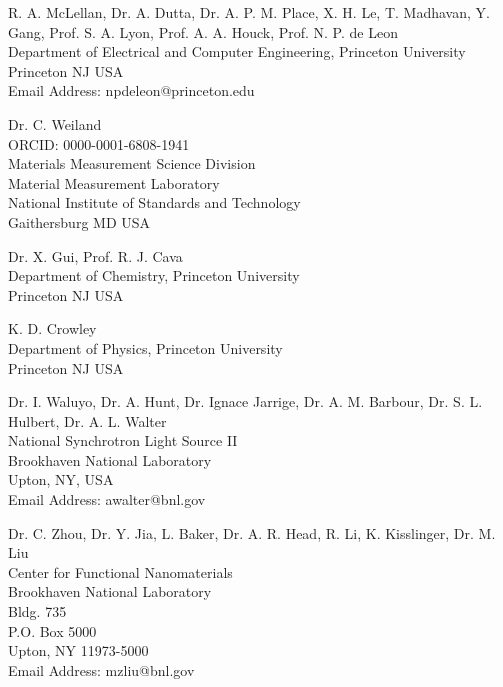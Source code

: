 \documentclass{WileyMSP-template}
\begin{document}
\begin{affiliations}
R. A. McLellan, Dr. A. Dutta, Dr. A. P. M. Place, X. H. Le, T. Madhavan, Y. Gang, Prof. S. A. Lyon, Prof. A. A. Houck, Prof. N. P. de Leon\\
Department of Electrical and Computer Engineering, Princeton University \\
Princeton NJ USA\\
Email Address: npdeleon@princeton.edu
\medskip

Dr. C. Weiland\\
ORCID: 0000-0001-6808-1941 \\
Materials Measurement Science Division \\ Material Measurement Laboratory\\
National Institute of Standards and Technology \\
Gaithersburg MD USA

\medskip

Dr. X. Gui, Prof. R. J. Cava \\
Department of Chemistry, Princeton University \\
Princeton NJ USA\\
\medskip

K. D. Crowley \\
Department of Physics, Princeton University \\
Princeton NJ USA\\
\medskip

Dr. I. Waluyo, Dr. A. Hunt, Dr. Ignace Jarrige, Dr. A. M. Barbour, Dr. S. L. Hulbert, Dr. A. L. Walter\\
National Synchrotron Light Source II\\
Brookhaven National Laboratory\\
Upton, NY, USA\\
Email Address: awalter@bnl.gov
\medskip

Dr. C. Zhou, Dr. Y. Jia, L. Baker, Dr. A. R. Head, R. Li, K. Kisslinger, Dr. M. Liu\\
Center for Functional Nanomaterials\\
Brookhaven National Laboratory\\
Bldg. 735\\
P.O. Box 5000\\
Upton, NY 11973-5000\\
Email Address: mzliu@bnl.gov
\end{affiliations}


\end{document}

